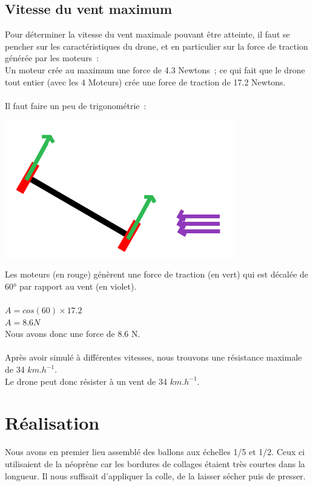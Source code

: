 \documentclass[a4paper,11pt]{article}
\begin{document}
\subsection{Vitesse du vent maximum}
Pour déterminer la vitesse du vent maximale pouvant être atteinte, il faut se pencher sur les caractéristiques du drone, et en particulier sur la force de traction générée par les moteurs~:\\
Un moteur crée au maximum une force de 4.3 Newtons~; ce qui fait que le drone tout entier (avec les 4 Moteurs) crée une force de traction de 17.2 Newtons.\\
\\
Il faut faire un peu de trigonométrie~:
\begin{center}
	\includegraphics[width=10cm]{../Images/vitesseVent.png}
\end{center}
Les moteurs (en rouge) génèrent une force de traction (en vert) qui est décalée de 60° par rapport au vent (en violet).\\
\\
$A = cos(60) \times 17.2$\\
$A = 8.6 N$\\
Nous avons donc une force de 8.6 N.\\
\\
Après avoir simulé à différentes vitesses, nous trouvons une résistance maximale de 34 $km.h^{-1}$.\\
Le drone peut donc résister à un vent de 34 $km.h^{-1}$.

\newpage

\section{Réalisation}

Nous avons en premier lieu assemblé des ballons aux échelles 1/5 et 1/2. Ceux ci utilisaient de la néoprène car les bordures de collages étaient très courtes dans la longueur. Il nous suffisait d'appliquer la colle, de la laisser sécher puis de presser.
\end{document}
